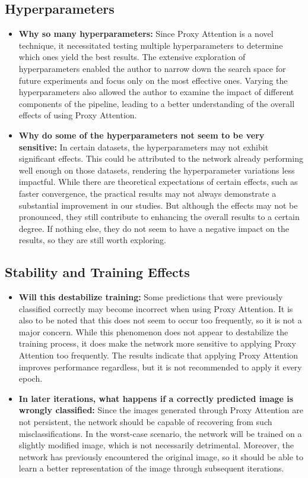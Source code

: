 \documentclass[a4paper,11pt,openright]{book}
\begin{document}
\subsection{Hyperparameters}
\begin{itemize}
    \item \textbf{Why so many hyperparameters: } Since Proxy Attention is a novel technique, it necessitated testing multiple hyperparameters to determine which ones yield the best results. The extensive exploration of hyperparameters enabled the author to narrow down the search space for future experiments and focus only on the most effective ones. Varying the hyperparameters also allowed the author to examine the impact of different components of the pipeline, leading to a better understanding of the overall effects of using Proxy Attention.

    \item \textbf{Why do some of the hyperparameters not seem to be very sensitive: } In certain datasets, the hyperparameters may not exhibit significant effects. This could be attributed to the network already performing well enough on those datasets, rendering the hyperparameter variations less impactful. While there are theoretical expectations of certain effects, such as faster convergence, the practical results may not always demonstrate a substantial improvement in our studies. But although the effects may not be pronounced, they still contribute to enhancing the overall results to a certain degree. If nothing else, they do not seem to have a negative impact on the results, so they are still worth exploring.
\end{itemize}

\subsection{Stability and Training Effects}
\begin{itemize}
    \item \textbf{Will this destabilize training: } Some predictions that were previously classified correctly may become incorrect when using Proxy Attention. It is also to be noted that this does not seem to occur too frequently, so it is not a major concern. While this phenomenon does not appear to destabilize the training process, it does make the network more sensitive to applying Proxy Attention too frequently. The results indicate that applying Proxy Attention improves performance regardless, but it is not recommended to apply it every epoch. 

    \item \textbf{In later iterations, what happens if a correctly predicted image is wrongly classified: } Since the images generated through Proxy Attention are not persistent, the network should be capable of recovering from such misclassifications. In the worst-case scenario, the network will be trained on a slightly modified image, which is not necessarily detrimental. Moreover, the network has previously encountered the original image, so it should be able to learn a better representation of the image through subsequent iterations.

\end{itemize}
\end{document}
